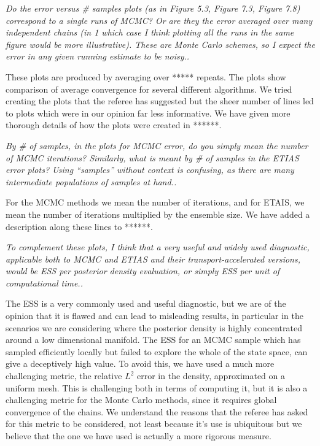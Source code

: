 \documentclass{article}
\newcommand{\comment}[2]{\vspace{0.6cm}{\bf Comment:} {\it #1.}

\vspace{0.3cm}{\bf Answer:} #2}
\begin{document}
\comment{Do the error versus \# samples plots (as in Figure 5.3, Figure 7.3, Figure 7.8) correspond to a single runs of MCMC? Or are they the error averaged over many independent chains (in
1
which case I think plotting all the runs in the same figure would be more illustrative). These are Monte Carlo schemes, so I expect the error in any given running estimate to be noisy.}{These plots are produced by averaging over ***** repeats. The plots show comparison of average convergence for several different algorithms. We tried creating the plots that the referee has suggested but the sheer number of lines led to plots which were in our opinion far less informative. We have given more thorough details of how the plots were created in ******.}

\comment{By \# of samples, in the plots for MCMC error, do you simply mean the number of MCMC iterations? Similarly, what is meant by \# of samples in the ETIAS error plots? Using “samples” without context is confusing, as there are many intermediate populations of samples at hand.}{For the MCMC methods we mean the number of iterations, and for ETAIS, we mean the number of iterations multiplied by the ensemble size. We have added a description along these lines to ******.}

\comment{To complement these plots, I think that a very useful and widely used diagnostic, applicable both to MCMC and ETIAS and their transport-accelerated versions, would be ESS per posterior density evaluation, or simply ESS per unit of computational time.}{The ESS is a very commonly used and useful diagnostic, but we are of the opinion that it is flawed and can lead to misleading results, in particular in the scenarios we are considering where the posterior density is highly concentrated around a low dimensional manifold. The ESS for an MCMC sample which has sampled efficiently locally but failed to explore the whole of the state space, can give a deceptively high value. To avoid this, we have used a much more challenging metric, the relative $L^2$ error in the density, approximated on a uniform mesh. This is challenging both in terms of computing it, but it is also a challenging metric for the Monte Carlo methods, since it requires global convergence of the chains. We understand the reasons that the referee has asked for this metric to be considered, not least because it's use is ubiquitous but we believe that the one we have used is actually a more rigorous measure.}
\end{document}

